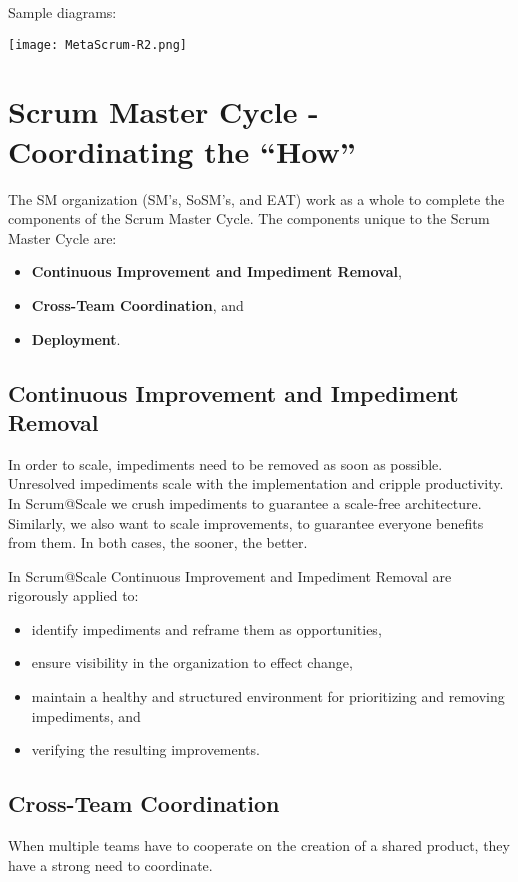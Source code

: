 \documentclass[12pt,a4paper,parskip=full]{scrartcl}
\begin{document}
Sample diagrams:

\texttt{[image: MetaScrum-R2.png]}

\section{Scrum Master Cycle - Coordinating the ``How''}

The SM organization (SM's, SoSM's, and EAT) work as a whole to complete the components of the Scrum Master Cycle. The components unique to the Scrum Master Cycle are: 
\begin{itemize}
	\item \textbf{Continuous Improvement and Impediment Removal},
	\item \textbf{Cross-Team Coordination}, and
	\item \textbf{Deployment}.
\end{itemize}

\subsection{Continuous Improvement and Impediment Removal}

In order to scale, impediments need to be removed as soon as possible.
Unresolved impediments scale with the implementation and cripple productivity.
In Scrum@Scale we crush impediments to guarantee a scale-free architecture.
Similarly, we also want to scale improvements, to guarantee everyone benefits from them.
In both cases, the sooner, the better.

In Scrum@Scale Continuous Improvement and Impediment Removal are rigorously applied to:

\begin{itemize}
	\item identify impediments and reframe them as opportunities,
	\item ensure visibility in the organization to effect change,
	\item maintain a healthy and structured environment for prioritizing and removing impediments, and 
	\item verifying the resulting improvements.
\end{itemize}

\subsection{Cross-Team Coordination}

When multiple teams have to cooperate on the creation of a shared product,
they have a strong need to coordinate.
\end{document}
